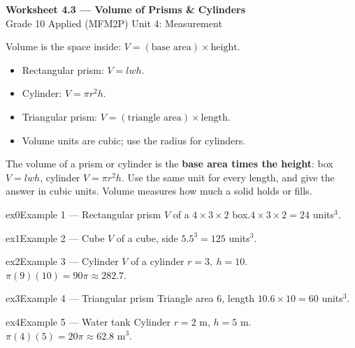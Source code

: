\documentclass[11pt]{article}
\begin{document}
\begin{center}
{\LARGE\bfseries\color{titleblue}Worksheet 4.3 --- Volume of Prisms \& Cylinders}\\[2pt]
{\small Grade 10 Applied (MFM2P) \textperiodcentered{} Unit 4: Measurement}
\end{center}

\begin{ideabox}
Volume is the space inside: $V=(\text{base area})\times\text{height}$.
\begin{itemize}[leftmargin=*,itemsep=2pt]
  \item Rectangular prism: $V=lwh$.
  \item Cylinder: $V=\pi r^2h$.
  \item Triangular prism: $V=(\text{triangle area})\times\text{length}$.
  \item Volume units are cubic; use the radius for cylinders.
\end{itemize}
\end{ideabox}

\begin{learnbox}
The volume of a prism or cylinder is the \textbf{base area times the height}: box $V=lwh$, cylinder $V=\pi r^2h$.
Use the same unit for every length, and give the answer in cubic units.
Volume measures how much a solid holds or fills.
\end{learnbox}


\begin{example}{ex0}{Example 1 --- Rectangular prism}
$V$ of a $4\times3\times2$ box.\soln $4\times3\times2=24$ units$^3$.
\end{example}

\begin{example}{ex1}{Example 2 --- Cube}
$V$ of a cube, side $5$.\soln $5^3=125$ units$^3$.
\end{example}

\begin{example}{ex2}{Example 3 --- Cylinder}
$V$ of a cylinder $r=3,\ h=10$.\soln $\pi(9)(10)=90\pi\approx282.7$.
\end{example}

\begin{example}{ex3}{Example 4 --- Triangular prism}
Triangle area $6$, length $10$.\soln $6\times10=60$ units$^3$.
\end{example}

\begin{example}{ex4}{Example 5 --- Water tank}
Cylinder $r=2$ m, $h=5$ m.\soln $\pi(4)(5)=20\pi\approx62.8$ m$^3$.
\end{example}
\end{document}
